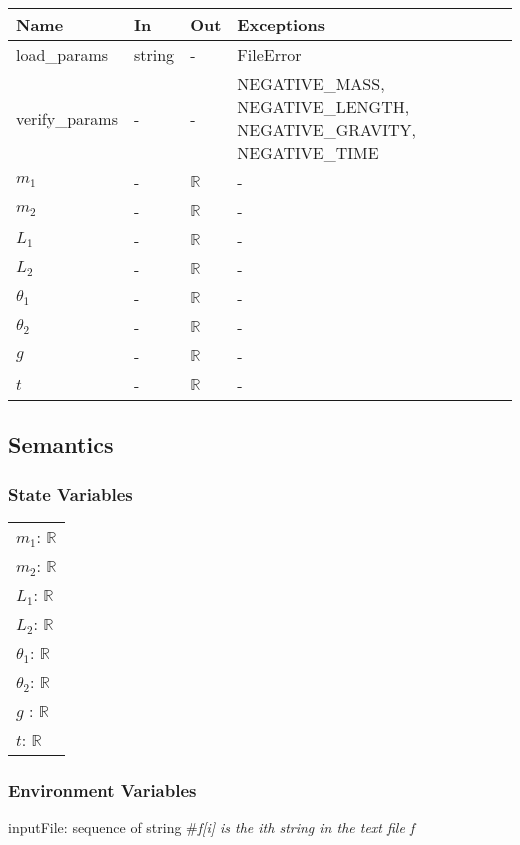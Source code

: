 \documentclass[12pt, titlepage]{article}
\begin{document}
\begin{center}
\begin{tabular}{p{4cm} p{2cm} p{2cm} p{6cm}}
\hline
\textbf{Name} & \textbf{In} & \textbf{Out} & \textbf{Exceptions} \\
\hline
load\_params & string & - & FileError \\
\hline
verify\_params & - & - & NEGATIVE\_MASS, NEGATIVE\_LENGTH, NEGATIVE\_GRAVITY, NEGATIVE\_TIME\\
\hline
$m_1$ & - & $\mathbb{R}$ & - \\
\hline
$m_2$ & - & $\mathbb{R}$ & -\\
\hline
$L_1$ & - & $\mathbb{R}$ & - \\
\hline
$L_2$ & - & $\mathbb{R}$ & -\\
\hline
$\theta_1$ & - & $\mathbb{R}$ & -\\
\hline
$\theta_2$ & - & $\mathbb{R}$ & - \\
\hline
$g$ & - & $\mathbb{R}$ & - \\
\hline
$t$ & - & $\mathbb{R}$ & - \\
\hline
\end{tabular}
\end{center}

\subsection{Semantics}

\subsubsection{State Variables}
\renewcommand{\arraystretch}{1.2}
\begin{longtable*}[l]{l} 

$m_1$: $\mathbb{R}$ \\
$m_2$: $\mathbb{R}$ \\
$L_1$: $\mathbb{R}$ \\
$L_2$: $\mathbb{R}$ \\
$\theta_1$: $\mathbb{R}$ \\
$\theta_2$: $\mathbb{R}$ \\
$g$ : $\mathbb{R}$ \\
$t$: $\mathbb{R}$ \\

\end{longtable*}

\subsubsection{Environment Variables}
inputFile: sequence of string \#\textit{f[i] is the ith string in the text file f}\\ 
\end{document}
